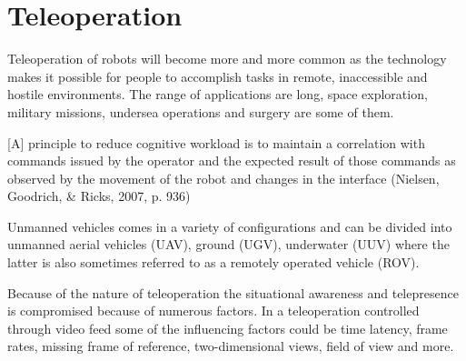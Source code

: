 \section{Teleoperation}


Teleoperation of robots will become more and more common as the technology makes it possible for people to accomplish tasks in remote, inaccessible and hostile environments. The range of applications are long, space exploration, military missions, undersea operations and surgery are some of them.

[A] principle to reduce cognitive workload is to maintain a correlation with commands issued by the operator and the expected result of those commands as observed by the movement of the robot and changes in the interface (Nielsen, Goodrich, \& Ricks, 2007, p. 936)

Unmanned vehicles comes in a variety of configurations and can be divided into unmanned aerial vehicles (UAV), ground (UGV), underwater (UUV) where the latter is also sometimes referred to as a remotely operated vehicle (ROV).

Because of the nature of teleoperation the situational awareness and telepresence is compromised because of numerous factors. In a teleoperation controlled through video feed some of the influencing factors could be time latency, frame rates, missing frame of reference, two-dimensional views, field of view and more.

